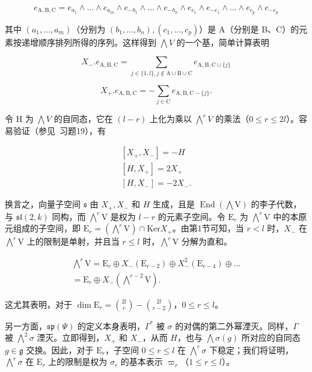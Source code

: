 \[
e _ {\mathrm{A,B,C}} = e _ {a _ {1}} \wedge \dots \wedge e _ {a _ {m}} \wedge e _ {- b _ {1}} \wedge \dots \wedge e _ {- b _ {n}} \wedge e _ {c _ {1}} \wedge e _ {- c _ {1}} \wedge \dots \wedge e _ {c _ {p}} \wedge e _ {- c _ {p}}
\]

其中 \((a_{1},\ldots,a_{m})\)（分别为 \((b_{1},\ldots,b_{n}),(c_{1},\ldots,c_{p})\)）是 A（分别是 B、C）的元素按递增顺序排列所得的序列。这样得到 \(\bigwedge V\) 的一个基，简单计算表明

\[
X _ {-}. e _ {\mathrm{A,B,C}} = \sum_ {j \in \{1, l \}, j \notin \mathrm{A} \cup \mathrm{B} \cup \mathrm{C}} e _ {\mathrm{A,B,C} \cup \{j \}}\tag{8}
\]

\[
X _ {+}. e _ {\mathrm{A,B,C}} = - \sum_ {j \in \mathrm{C}} e _ {\mathrm{A,B,C-} \{j \}}.\tag{9}
\]

令 H 为 \(\bigwedge V\) 的自同态，它在 \((l - r)\) 上化为乘以 \(\bigwedge^{r}V\) 的乘法（\(0 \leq r \leq 2l\)）。容易验证（参见~习题19），有

\[
\begin{array}{c} {[ X _ {+}, X _ {-} ] = - H} \\ {[ H, X _ {+} ] = 2 X _ {+}} \\ {[ H, X _ {-} ] = - 2 X _ {-}.} \end{array}
\]

换言之，向量子空间 \(\mathfrak{s}\) 由 \(X_{+}, X_{-}\) 和 \(H\) 生成，且是 \(\operatorname{End}(\bigwedge \mathrm{V})\) 的李子代数，与 \(\mathfrak{sl}(2, k)\) 同构，而 \(\bigwedge^{r} \mathrm{V}\) 是权为 \(l - r\) 的元素子空间。令 \(\mathrm{E}_{r}\) 为 \(\bigwedge^{r} \mathrm{V}\) 中的本原元组成的子空间，即 \(\mathrm{E}_{r} = (\bigwedge^{r} \mathrm{V}) \cap \mathrm{Ker} X_{+}\)。由第1节可知，当 \(r < l\) 时，\(X_{-}\) 在 \(\bigwedge^{r} \mathrm{V}\) 上的限制是单射，并且当 \(r \leq l\) 时，\(\bigwedge^{r} \mathrm{V}\) 分解为直和。

\[
\begin{array}{c} \bigwedge^ {r} \mathrm{V} = \mathrm{E} _ {r} \oplus X _ {-} (\mathrm{E} _ {r - 2}) \oplus X _ {-} ^ {2} (\mathrm{E} _ {r - 4}) \oplus \dots \\ = \mathrm{E} _ {r} \oplus X _ {-} (\bigwedge^ {r - 2} \mathrm{V}). \end{array}
\]

这尤其表明，对于 \(\dim \mathrm{E}_r = \binom{2l}{r} - \binom{2l}{r-2}\)，\(0 \leq r \leq l\)。

另一方面，\(\mathfrak{sp}(\varPsi)\) 的定义本身表明，\(\Gamma^{*}\) 被 \(\sigma\) 的对偶的第二外幂湮灭。同样，\(\Gamma\) 被 \(\bigwedge^{2}\sigma\) 湮灭。立即得到，\(X_{+}\) 和 \(X_{-}\)，从而 \(H\)，也与 \(\bigwedge\sigma(g)\) 所对应的自同态 \(g\in\mathfrak{g}\) 交换。因此，对于 \(\mathrm{E}_{r}\)，子空间 \(0\leq r\leq l\) 在 \(\bigwedge^{r}\sigma\) 下稳定；我们将证明，\(\bigwedge^{r}\sigma\) 在 \(\mathrm{E}_{r}\) 上的限制是权为 \(\sigma_{r}\) 的基本表示 \(\varpi_{r}\)（\(1\leq r\leq l\)）。

